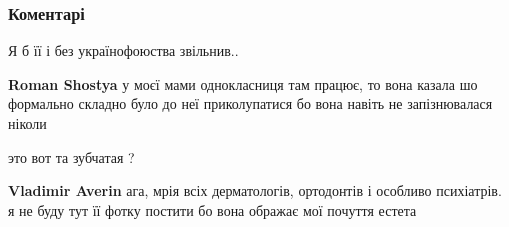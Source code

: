  
 
 
 
 
\subsubsection{Коментарі}

\begin{itemize}
 
Я б її і без українофоюства звільнив..

\begin{itemize}
 
\textbf{Roman Shostya} у моєї мами однокласниця там працює, то вона казала шо формально складно було до неї приколупатися бо вона навіть не запізнювалася ніколи
\end{itemize}

 
это вот та зубчатая ?

\begin{itemize}
 
\textbf{Vladimir Averin} ага, мрія всіх дерматологів, ортодонтів і особливо психіатрів. я не буду тут її фотку постити бо вона ображає мої почуття естета
\end{itemize}


\end{itemize}
